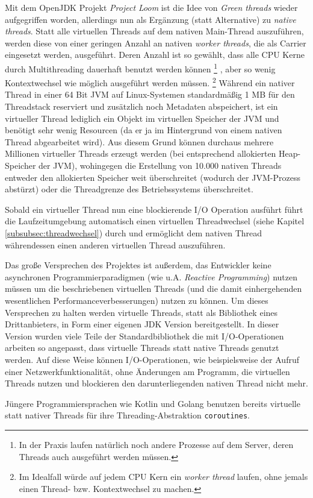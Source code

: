Mit dem OpenJDK Projekt \textit{Project Loom} ist die Idee von \textit{Green threads}
wieder aufgegriffen worden, allerdings nun als Ergänzung (statt Alternative) zu \textit{native threads}.
Statt alle virtuellen Threads auf dem nativen Main-Thread auszuführen, werden diese von einer geringen Anzahl an nativen \textit{worker threads},
die als Carrier eingesetzt werden, ausgeführt.
Deren Anzahl ist so gewählt, dass alle CPU Kerne durch Multithreading dauerhaft benutzt werden können
\footnote{In der Praxis laufen natürlich noch andere Prozesse auf dem Server, deren Threads auch ausgeführt werden müssen.}
, aber so wenig Kontextwechsel wie möglich ausgeführt werden müssen.\parencite{Oracle2021}
\footnote{Im Idealfall würde auf jedem CPU Kern ein \textit{worker thread} laufen,	ohne jemals einen Thread- bzw. Kontextwechsel zu machen.}
Während ein nativer Thread in einer 64 Bit JVM auf Linux-Systemen standardmäßig 1 MB für den Threadstack reserviert
und zusätzlich noch Metadaten abspeichert, ist ein virtueller Thread
lediglich ein Objekt im virtuellen Speicher der JVM und benötigt sehr wenig Resourcen (da er ja im Hintergrund von einem
nativen Thread abgearbeitet wird).
Aus diesem Grund können durchaus mehrere Millionen virtueller Threads erzeugt werden (bei entsprechend allokierten Heap-Speicher der JVM), wohingegen
die Erstellung von 10.000 nativen Threads entweder den allokierten Speicher weit überschreitet (wodurch der JVM-Prozess abstürzt) oder die Threadgrenze
des Betriebssystems überschreitet.

Sobald ein virtueller Thread nun eine blockierende I/O Operation ausführt führt die Laufzeitumgebung automatisch einen
virtuellen Threadwechsel (siehe Kapitel \ref{subsubsec:threadwechsel}) durch und ermöglicht dem nativen Thread währendessen einen
anderen virtuellen Thread auszuführen.

Das große Versprechen des Projektes ist außerdem, das Entwickler keine asynchronen Programmierparadigmen (wie u.A. \textit{Reactive Programming})
nutzen müssen um die beschriebenen virtuellen Threads (und die damit einhergehenden wesentlichen Performanceverbesserungen) nutzen zu können.
Um dieses Versprechen zu halten werden virtuelle Threads, statt als Bibliothek eines Drittanbieters, in Form einer eigenen JDK Version bereitgestellt.
In dieser Version wurden viele Teile der Standardbibliothek die mit I/O-Operationen arbeiten so angepasst, dass virtuelle Threads statt native Threads
genutzt werden. Auf diese Weise können I/O-Operationen, wie beispielsweise der Aufruf einer Netzwerkfunktionalität, ohne Änderungen am Programm,
die virtuellen Threads nutzen und blockieren den darunterliegenden nativen Thread nicht mehr.

Jüngere Programmiersprachen wie Kotlin und Golang benutzen bereits virtuelle statt nativer Threads
für ihre Threading-Abstraktion \verb|coroutines|. \parencite{KotlinCoroutines, GoCoroutines}